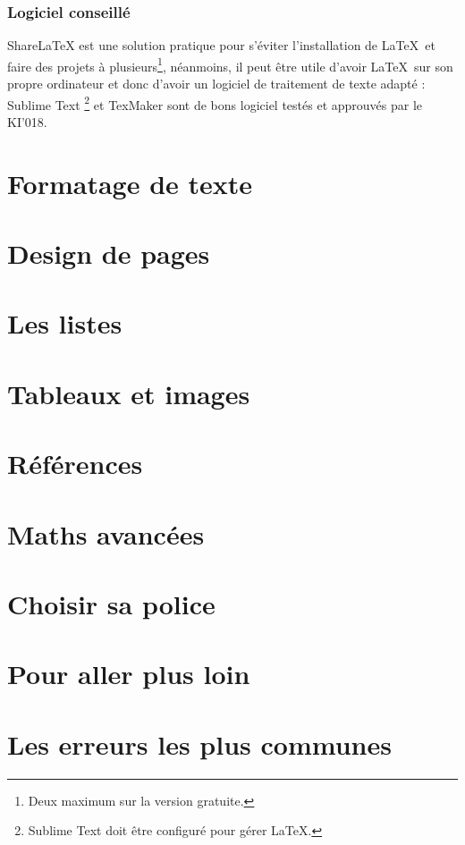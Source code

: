 \documentclass[11pt]{article}				%
\begin{document}
\subsubsection{Logiciel conseillé}


\noindent ShareLaTeX est une solution pratique pour s'éviter l'installation de \LaTeX \ et faire des projets à plusieurs\footnote{Deux maximum sur la version gratuite.}, néanmoins, il peut être utile d'avoir \LaTeX \ sur son propre ordinateur et donc d'avoir un logiciel de traitement de texte adapté : Sublime Text \footnote{Sublime Text doit être configuré pour gérer \LaTeX.} et TexMaker sont de bons logiciel testés et approuvés par le KI'018.

\section{Formatage de texte}

\section{Design de pages}

\section{Les listes}

\section{Tableaux et images}

\section{Références}

\section{Maths avancées}

\section{Choisir sa police}

\section{Pour aller plus loin}

\section{Les erreurs les plus communes}
\end{document}
